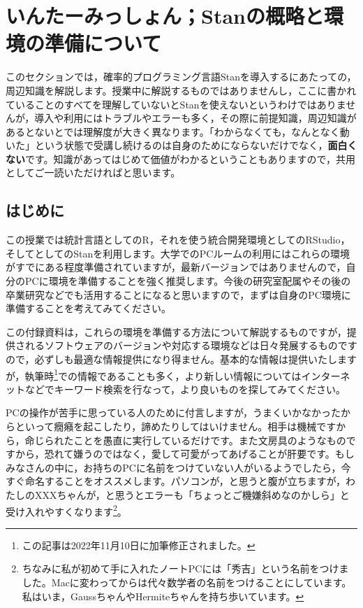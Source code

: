 \documentclass{ltjsbook}
\begin{document}
\VerbatimFootnotes
\chapter{いんたーみっしょん；Stanの概略と環境の準備について}
\label{PrepareStan}

このセクションでは，確率的プログラミング言語Stanを導入するにあたっての，周辺知識を解説します。授業中に解説するものではありませんし，ここに書かれていることのすべてを理解していないとStanを使えないというわけではありませんが，導入や利用にはトラブルやエラーも多く，その際に前提知識，周辺知識があるとないとでは理解度が大きく異なります。「わからなくても，なんとなく動いた」という状態で受講し続けるのは自身のためにならないだけでなく，\textbf{面白くない}です。知識があってはじめて価値がわかるということもありますので，共用としてご一読いただければと思います。

\section{はじめに}
この授業では統計言語としてのR，それを使う統合開発環境としてのRStudio，そしてとしてのStanを利用します。大学でのPCルームの利用にはこれらの環境がすでにある程度準備されていますが，最新バージョンではありませんので，自分のPCに環境を準備することを強く推奨します。今後の研究室配属やその後の卒業研究などでも活用することになると思いますので，まずは自身のPC環境に準備することを考えてみてください。

この付録資料は，これらの環境を準備する方法について解説するものですが，提供されるソフトウェアのバージョンや対応する環境などは日々発展するものですので，必ずしも最適な情報提供になり得ません。基本的な情報は提供いたしますが，執筆時\footnote{この記事は2022年11月10日に加筆修正されました。}での情報であることも多く，より新しい情報についてはインターネットなどでキーワード検索を行なって，より良いものを探してみてください。

PCの操作が苦手に思っている人のために付言しますが，うまくいかなかったからといって癇癪を起こしたり，諦めたりしてはいけません。相手は機械ですから，命じられたことを愚直に実行しているだけです。また文房具のようなものですから，恐れて嫌うのではなく，愛して可愛がってあげることが肝要です。もしみなさんの中に，お持ちのPCに名前をつけていない人がいるようでしたら，今すぐ命名することをオススメします。パソコンが，と思うと腹が立ちますが，わたしのXXXちゃんが，と思うとエラーも「ちょっとご機嫌斜めなのかしら」と受け入れやすくなります\footnote{ちなみに私が初めて手に入れたノートPCには「秀吉」という名前をつけました。Macに変わってからは代々数学者の名前をつけることにしています。私はいま，GaussちゃんやHermiteちゃんを持ち歩いています。}。
\end{document}
